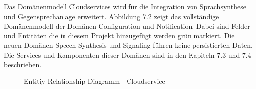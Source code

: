 Das Domänenmodell Cloudservices wird für die Integration von Sprachsynthese und Gegensprechanlage erweitert.
Abbildung 7.2 zeigt das vollständige Domänenmodell der Domänen Configuration und Notification.
Dabei sind Felder und Entitäten die in diesem Projekt hinzugefügt werden grün markiert.
Die neuen Domänen Speech Synthesis und Signaling führen keine persistierten Daten.
Die Services und Komponenten dieser Domänen sind in den Kapiteln 7.3 und 7.4 beschrieben.

\begin{figure}[h]
    \centering
    \begin{minipage}[b]{0.9\textwidth}
        \caption{Entitiy Relationship Diagramm - Cloudservice}
    \end{minipage}
\end{figure}

\clearpage
